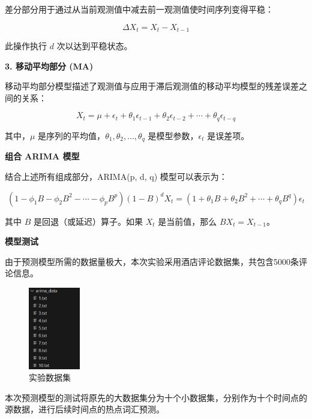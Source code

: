 \documentclass[UTF8,a4paper,15pt,titlepage,oneside]{ctexbook}
\begin{document}
差分部分用于通过从当前观测值中减去前一观测值使时间序列变得平稳：

\begin{equation}
\Delta X_t = X_t - X_{t-1}
\end{equation}

此操作执行 $d$ 次以达到平稳状态。

\vskip 0.2cm
\noindent
\textbf{3. 移动平均部分 (MA)}

移动平均部分模型描述了观测值与应用于滞后观测值的移动平均模型的残差误差之间的关系：

\begin{equation}
X_t = \mu + \epsilon_t + \theta_1 \epsilon_{t-1} + \theta_2 \epsilon_{t-2} + \cdots + \theta_q \epsilon_{t-q}
\end{equation}

其中，$\mu$ 是序列的平均值，$\theta_1, \theta_2, \ldots, \theta_q$ 是模型参数，$\epsilon_t$ 是误差项。

\vskip 0.2cm
\noindent
\textbf{组合 ARIMA 模型}

结合上述所有组成部分，ARIMA(p, d, q) 模型可以表示为：

\begin{equation}
(1 - \phi_1 B - \phi_2 B^2 - \cdots - \phi_p B^p)(1 - B)^d X_t = (1 + \theta_1 B + \theta_2 B^2 + \cdots + \theta_q B^q) \epsilon_t
\end{equation}

其中 $B$ 是回退（或延迟）算子。如果 $X_t$ 是当前值，那么 $BX_t = X_{t-1}$。

\vskip 0.2cm
\noindent
\textbf{模型测试}

由于预测模型所需的数据量极大，本次实验采用酒店评论数据集，共包含5000条评论信息。

\begin{figure}[H]
  \centering
  \includegraphics[width=0.2\textwidth,keepaspectratio=false]{pictures/21.png} %
  \caption{实验数据集}
\end{figure}

本次预测模型的测试将原先的大数据集分为十个小数据集，分别作为十个时间点的源数据，进行后续时间点的热点词汇预测。
\end{document}
